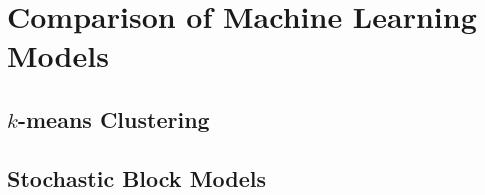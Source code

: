 
\chapter{Comparison of Machine Learning Models}
\label{ch:comparison}
\vspace{2em}

\section{$k$-means Clustering}
\section{Stochastic Block Models}
